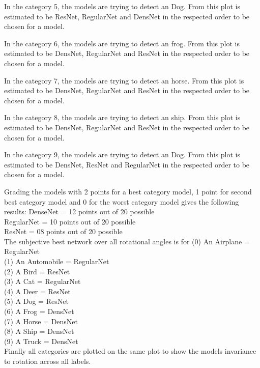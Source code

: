 In the category 5, the models are trying to detect an Dog. From this plot is estimated to be ResNet, RegularNet and DensNet in the respected order to be chosen for a model.

\FloatBarrier 

In the category 6, the models are trying to detect an frog. From this plot is estimated to be DensNet, RegularNet and ResNet in the respected order to be chosen for a model. 

\FloatBarrier 

In the category 7, the models are trying to detect an horse. From this plot is estimated to be DensNet, RegularNet and ResNet in the respected order to be chosen for a model.

\FloatBarrier 

In the category 8, the models are trying to detect an ship. From this plot is estimated to be DensNet, RegularNet and ResNet in the respected order to be chosen for a model. 

\FloatBarrier 

In the category 9, the models are trying to detect an Dog. From this plot is estimated to be DensNet, ResNet and RegularNet in the respected order to be chosen for a model. 

\FloatBarrier

Grading the models with 2 points for a best category model, 1 point for second best category model and 0 for the worst category model gives the following results:
DenseNet   = 12 points out of 20 possible\\
RegularNet = 10 points out of 20 possible\\
ResNet     = 08 points out of 20 possible\\

The subjective best network over all rotational angles is for
(0) An Airplane   = RegularNet\\
(1) An Automobile = RegularNet\\
(2) A Bird        = ResNet\\ 
(3) A Cat         = RegularNet\\
(4) A Deer        = ResNet\\
(5) A Dog         = ResNet\\
(6) A Frog        = DensNet\\
(7) A Horse       = DensNet\\
(8) A Ship        = DensNet\\
(9) A Truck       = DensNet\\

Finally all categories are plotted on the same plot to show the models invariance to rotation across all labels.
